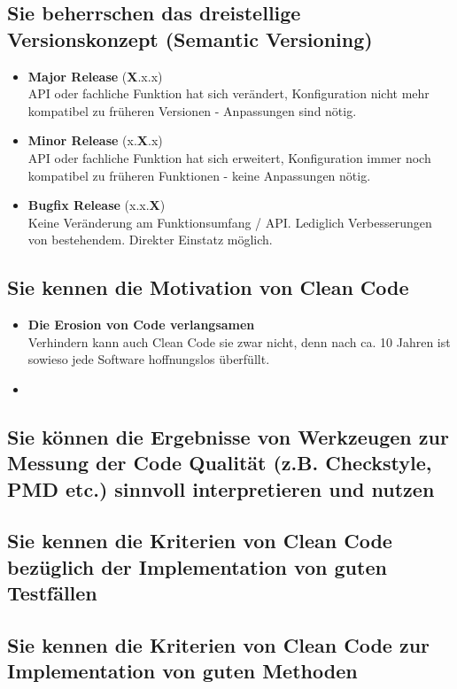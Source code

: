 \subsection{Sie beherrschen das dreistellige Versionskonzept (Semantic Versioning)}
\begin{itemize}
  \item \textbf{Major Release} (\textbf{X}.x.x)\\
  API oder fachliche Funktion hat sich verändert, Konfiguration nicht mehr kompatibel zu früheren Versionen - Anpassungen sind nötig.
  \item \textbf{Minor Release} (x.\textbf{X}.x)\\
  API oder fachliche Funktion hat sich erweitert, Konfiguration immer noch kompatibel zu früheren Funktionen - keine Anpassungen nötig.
  \item \textbf{Bugfix Release} (x.x.\textbf{X})\\
  Keine Veränderung am Funktionsumfang / API. Lediglich Verbesserungen von bestehendem. Direkter Einstatz möglich.
  
\end{itemize}

\subsection{Sie kennen die Motivation von Clean Code}
\begin{itemize}
  \item \textbf{Die Erosion von Code verlangsamen} \\
   Verhindern kann auch Clean Code sie zwar nicht, denn nach ca. 10 Jahren ist sowieso jede Software hoffnungslos überfüllt. 
   \item \textbf{}
\end{itemize}

\subsection{Sie können die Ergebnisse von Werkzeugen zur Messung der Code Qualität (z.B. Checkstyle, PMD etc.) sinnvoll interpretieren und nutzen}
\subsection{Sie kennen die Kriterien von Clean Code bezüglich der Implementation von guten Testfällen}
\subsection{Sie kennen die Kriterien von Clean Code zur Implementation von guten Methoden}